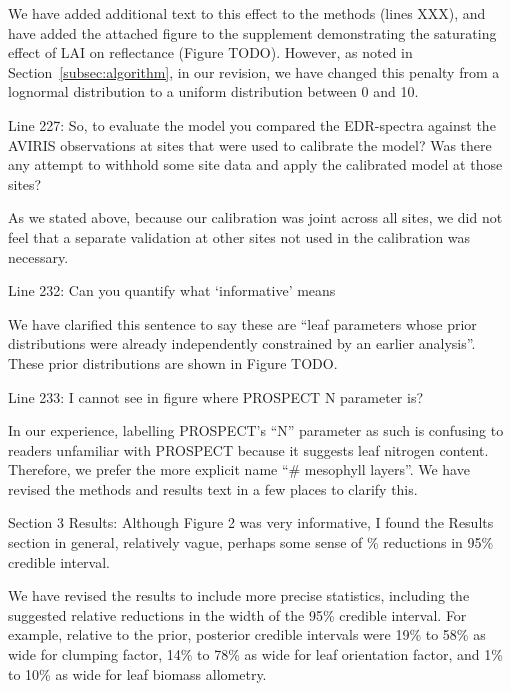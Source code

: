 We have added additional text to this effect to the methods (lines XXX), and have added the attached figure to the supplement demonstrating the saturating effect of LAI on reflectance (Figure TODO).
However, as noted in Section~\ref{subsec:algorithm}, in our revision, we have changed this penalty from a lognormal distribution to a uniform distribution between 0 and 10.

\begin{reviewer}
  Line 227: So, to evaluate the model you compared the EDR-spectra against the AVIRIS observations at sites that were used to calibrate the model? Was there any attempt to withhold some site data and apply the calibrated model at those sites?
\end{reviewer}

As we stated above, because our calibration was joint across all sites, we did not feel that a separate validation at other sites not used in the calibration was necessary.

\begin{reviewer}
  Line 232: Can you quantify what ‘informative’ means
\end{reviewer}

We have clarified this sentence to say these are ``leaf parameters whose prior distributions were already independently constrained by an earlier analysis''. These prior distributions are shown in Figure TODO.

\begin{reviewer}
  Line 233: I cannot see in figure where PROSPECT N parameter is?
\end{reviewer}

In our experience, labelling PROSPECT’s ``N'' parameter as such is confusing to readers unfamiliar with PROSPECT because it suggests leaf nitrogen content.
Therefore, we prefer the more explicit name ``\# mesophyll layers''.
We have revised the methods and results text in a few places to clarify this.

\begin{reviewer}
  Section 3 Results: Although Figure 2 was very informative, I found the Results section in general, relatively vague, perhaps some sense of \% reductions in 95\% credible interval.
\end{reviewer}

We have revised the results to include more precise statistics, including the suggested relative reductions in the width of the 95\% credible interval.
For example, relative to the prior, posterior credible intervals were 19\% to 58\% as wide for clumping factor, 14\% to 78\% as wide for leaf orientation factor, and 1\% to 10\% as wide for leaf biomass allometry.

